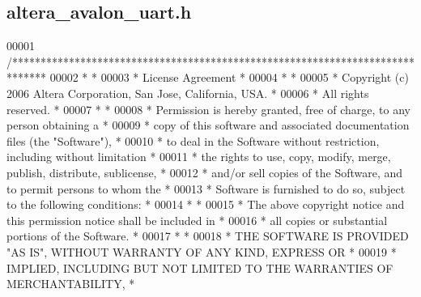 \subsection{altera\+\_\+avalon\+\_\+uart.\+h}
\label{altera__avalon__uart_8h_source}

\begin{DoxyCode}
00001 \textcolor{comment}{/******************************************************************************}
00002 \textcolor{comment}{*                                                                             *}
00003 \textcolor{comment}{* License Agreement                                                           *}
00004 \textcolor{comment}{*                                                                             *}
00005 \textcolor{comment}{* Copyright (c) 2006 Altera Corporation, San Jose, California, USA.           *}
00006 \textcolor{comment}{* All rights reserved.                                                        *}
00007 \textcolor{comment}{*                                                                             *}
00008 \textcolor{comment}{* Permission is hereby granted, free of charge, to any person obtaining a     *}
00009 \textcolor{comment}{* copy of this software and associated documentation files (the "Software"),  *}
00010 \textcolor{comment}{* to deal in the Software without restriction, including without limitation   *}
00011 \textcolor{comment}{* the rights to use, copy, modify, merge, publish, distribute, sublicense,    *}
00012 \textcolor{comment}{* and/or sell copies of the Software, and to permit persons to whom the       *}
00013 \textcolor{comment}{* Software is furnished to do so, subject to the following conditions:        *}
00014 \textcolor{comment}{*                                                                             *}
00015 \textcolor{comment}{* The above copyright notice and this permission notice shall be included in  *}
00016 \textcolor{comment}{* all copies or substantial portions of the Software.                         *}
00017 \textcolor{comment}{*                                                                             *}
00018 \textcolor{comment}{* THE SOFTWARE IS PROVIDED "AS IS", WITHOUT WARRANTY OF ANY KIND, EXPRESS OR  *}
00019 \textcolor{comment}{* IMPLIED, INCLUDING BUT NOT LIMITED TO THE WARRANTIES OF MERCHANTABILITY,    *}

\end{DoxyCode}
